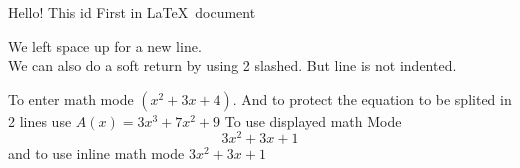 \documentclass[11pt]{article}
\begin{document}
	Hello! This id First in \LaTeX\ document
	
	We left space up for a new line.\\ We can also do a soft return by using 2 slashed. But line is not indented. 
	
	To enter math mode $(x^2+3x+4)$. And to protect the equation to be splited in 2 lines use ${A(x) = 3x^3+7x^2+9}$ 
	To use displayed math Mode $$3x^2 + 3x+1$$ and to use inline math mode $3x^2 + 3x+1$
	
\end{document}

